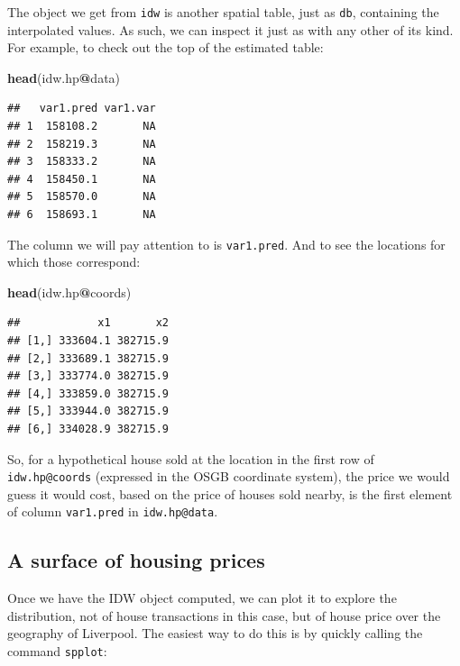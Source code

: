 \documentclass[]{book}
\newenvironment{Shaded}{\begin{snugshade}}{\end{snugshade}}
\newcommand{\KeywordTok}[1]{\textcolor[rgb]{0.13,0.29,0.53}{\textbf{#1}}}
\newcommand{\OperatorTok}[1]{\textcolor[rgb]{0.81,0.36,0.00}{\textbf{#1}}}
\newcommand{\NormalTok}[1]{#1}
\begin{document}
The object we get from \texttt{idw} is another spatial table, just as
\texttt{db}, containing the interpolated values. As such, we can inspect
it just as with any other of its kind. For example, to check out the top
of the estimated table:

\begin{Shaded}
\begin{Highlighting}[]
\KeywordTok{head}\NormalTok{(idw.hp}\OperatorTok{@}\NormalTok{data)}
\end{Highlighting}
\end{Shaded}

\begin{verbatim}
##   var1.pred var1.var
## 1  158108.2       NA
## 2  158219.3       NA
## 3  158333.2       NA
## 4  158450.1       NA
## 5  158570.0       NA
## 6  158693.1       NA
\end{verbatim}

The column we will pay attention to is \texttt{var1.pred}. And to see
the locations for which those correspond:

\begin{Shaded}
\begin{Highlighting}[]
\KeywordTok{head}\NormalTok{(idw.hp}\OperatorTok{@}\NormalTok{coords)}
\end{Highlighting}
\end{Shaded}

\begin{verbatim}
##            x1       x2
## [1,] 333604.1 382715.9
## [2,] 333689.1 382715.9
## [3,] 333774.0 382715.9
## [4,] 333859.0 382715.9
## [5,] 333944.0 382715.9
## [6,] 334028.9 382715.9
\end{verbatim}

So, for a hypothetical house sold at the location in the first row of
\texttt{idw.hp@coords} (expressed in the OSGB coordinate system), the
price we would guess it would cost, based on the price of houses sold
nearby, is the first element of column \texttt{var1.pred} in
\texttt{idw.hp@data}.

\subsection{A surface of housing
prices}\label{a-surface-of-housing-prices}

Once we have the IDW object computed, we can plot it to explore the
distribution, not of house transactions in this case, but of house price
over the geography of Liverpool. The easiest way to do this is by
quickly calling the command \texttt{spplot}:
\end{document}
